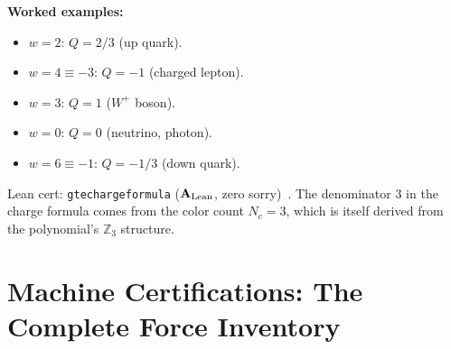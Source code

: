 \documentclass[11pt,a4paper]{article}
\newcommand{\lean}[1]{%
  \penalty-100
  \begingroup\def\_{\textunderscore\allowbreak}\texttt{#1}\endgroup}
\newcommand{\CatAL}{\ensuremath{\mathbf{A}_{\rm Lean}}}
\begin{document}
\textbf{Worked examples:}
\begin{itemize}[itemsep=2pt]
  \item $w = 2$: $Q = 2/3$ (up quark). \checkmark
  \item $w = 4 \equiv -3$: $Q = -1$ (charged lepton). \checkmark
  \item $w = 3$: $Q = 1$ ($W^+$ boson). \checkmark
  \item $w = 0$: $Q = 0$ (neutrino, photon). \checkmark
  \item $w = 6 \equiv -1$: $Q = -1/3$ (down quark). \checkmark
\end{itemize}
Lean cert: \lean{gte\_charge\_formula} (\CatAL, zero sorry)~\cite{SpivackGTECompleteFramework}.
The denominator 3 in the charge formula comes from the color count $N_c = 3$,
which is itself derived from the polynomial's $\mathbb{Z}_3$ structure.

\section{Machine Certifications: The Complete Force Inventory}
\label{sec:inventory}
\end{document}
